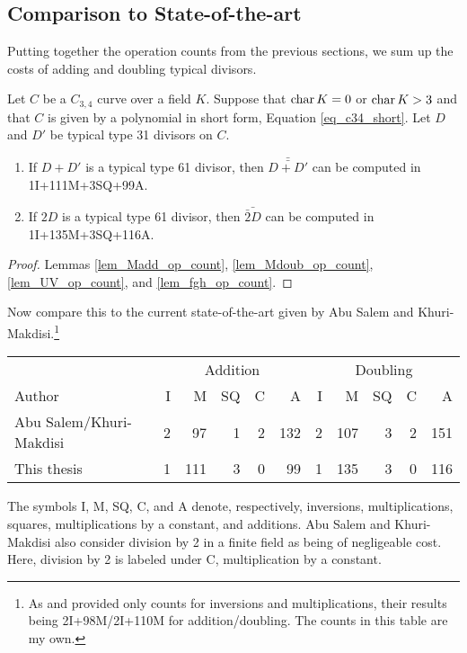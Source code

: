 \subsection{Comparison to State-of-the-art}

Putting together the operation counts from the previous sections,
we sum up the costs of adding and doubling typical divisors.
\begin{theorem}
  \label{thm_op_count}
  Let $C$ be a $C_{3,4}$ curve over a field $K$.
  Suppose that $\operatorname{char} K = 0$ or $\operatorname{char} K > 3$ and that $C$ is given by a polynomial in short form,
  Equation \ref{eq_c34_short}.
  Let $D$ and $D'$ be typical type 31 divisors on $C$.
  \begin{enumerate}[label=(\roman*)]
    \item
    If $D + D'$ is a typical type 61 divisor, then $\bar{\bar{D + D'}}$ can be computed in 1I+111M+3SQ+99A.
    \item
    If $2D$ is a typical type 61 divisor, then $\bar{\bar 2D}$ can be computed in 1I+135M+3SQ+116A.
  \end{enumerate}
\end{theorem}
\begin{proof}
  Lemmas \ref{lem_Madd_op_count}, \ref{lem_Mdoub_op_count}, \ref{lem_UV_op_count}, and \ref{lem_fgh_op_count}.
\end{proof}

Now compare this to the current state-of-the-art given by
Abu Salem and Khuri-Makdisi.\footnote{
As \cite{kmakdisi18} and \cite{salem07} provided only counts for inversions and multiplications,
their results being 2I+98M/2I+110M for addition/doubling. The counts in this table are my own.}
\begin{center}
\begin{tabular}{|l|rrrrr|rrrrr|}
  \hline
  & \multicolumn{5}{c|}{Addition} & \multicolumn{5}{c|}{Doubling} \\
  Author                  & I &  M & SQ & C &   A & I &   M & SQ & C & A \\
  \hline
  Abu Salem/Khuri-Makdisi \cite{kmakdisi18,salem07}
                          & 2 & 97 &  1 & 2 & 132 & 2 & 107 &  3 & 2 & 151 \\
  This thesis             & 1 & 111 & 3 & 0 &  99 & 1 & 135 &  3 & 0 & 116 \\
  \hline
\end{tabular}
\end{center}
The symbols I, M, SQ, C, and A denote, respectively,
inversions, multiplications, squares, multiplications by a constant, and additions.
Abu Salem and Khuri-Makdisi also consider division by 2 in a finite field as being of negligeable cost.
Here, division by 2 is labeled under C, multiplication by a constant.

